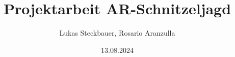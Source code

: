 \documentclass[oneside]{ausarbeitung}
\begin{document}

\Projektbericht
\Informatik


\title{Projektarbeit AR-Schnitzeljagd}
\author{Lukas Steckbauer, Rosario Aranzulla}
\date{13.08.2024}

\examinerIsAProfessorfalse

\maketitle
\cleardoublepage
{}
\setcounter{page}{1}
\makeaffirmation
\cleardoublepage

\begin{abstract}

\end{abstract}

\cleardoublepage
\tableofcontents

\listoffigures
\listoftables
\lstlistoflistings
\listofabbreviations
\begin{acronym}[Bsp.]

\end{acronym}
\cleardoublepage
{}
\setcounter{page}{1}


















\appendix
\printbibliography[heading=bibintoc]




\end{document}
